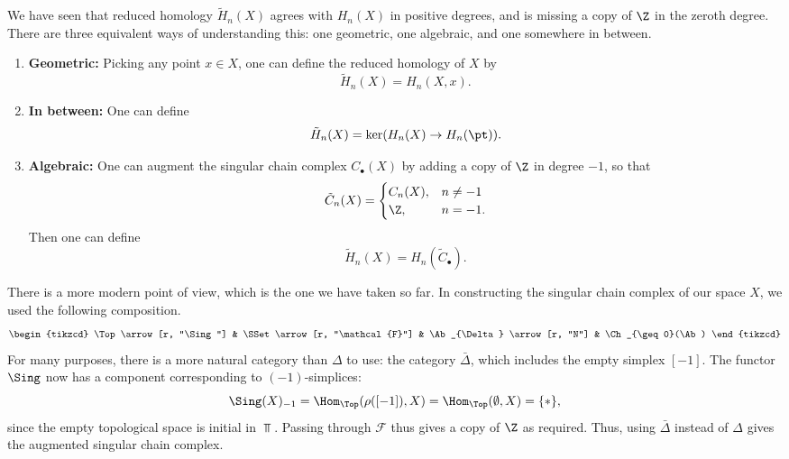 \documentclass[main.tex]{subfiles}
\begin{document}
We have seen that reduced homology $\tilde{H}_{n}(X)$ agrees with $H_{n}(X)$ in positive degrees, and is missing a copy of $\Z$ in the zeroth degree. There are three equivalent ways of understanding this: one geometric, one algebraic, and one somewhere in between.
\begin{enumerate}
  \item \textbf{Geometric:} Picking any point $x \in X$, one can define the reduced homology of $X$ by
    \begin{equation*}
      \tilde{H}_{n}(X) = H_{n}(X, x).
    \end{equation*}

  \item \textbf{In between:} One can define
    \begin{equation*}
      \tilde{H}_{n}(X) = \ker(H_{n}(X) \to H_{n}(\pt)).
    \end{equation*}

  \item \textbf{Algebraic:} One can augment the singular chain complex $C_{\bullet}(X)$ by adding a copy of $\Z$ in degree $-1$, so that
    \begin{equation*}
      \tilde{C}_{n}(X) =
      \begin{cases}
        C_{n}(X), &n \neq -1 \\
        \Z, &n = -1.
      \end{cases}
    \end{equation*}
    Then one can define
    \begin{equation*}
      \tilde{H}_{n}(X) = H_{n}(\tilde{C}_{\bullet}).
    \end{equation*}
\end{enumerate}

There is a more modern point of view, which is the one we have taken so far. In constructing the singular chain complex of our space $X$, we used the following composition.
\begin{equation*}
  \begin{tikzcd}
    \Top
    \arrow[r, "\Sing"]
    & \SSet
    \arrow[r, "\mathcal{F}"]
    & \Ab_{\Delta}
    \arrow[r, "N"]
    & \Ch_{\geq 0}(\Ab)
  \end{tikzcd}
\end{equation*}
For many purposes, there is a more natural category than $\Delta$ to use: the category $\bar{\Delta}$, which includes the empty simplex $[-1]$. The functor $\Sing$ now has a component corresponding to $(-1)$-simplices:
\begin{equation*}
  \Sing(X)_{-1} = \Hom_{\Top}(\rho([-1]), X) = \Hom_{\Top}(\emptyset, X) = \{*\},
\end{equation*}
since the empty topological space is initial in $\Top$. Passing through $\mathcal{F}$ thus gives a copy of $\Z$ as required. Thus, using $\bar{\Delta}$ instead of $\Delta$ gives the augmented singular chain complex.
\end{document}
